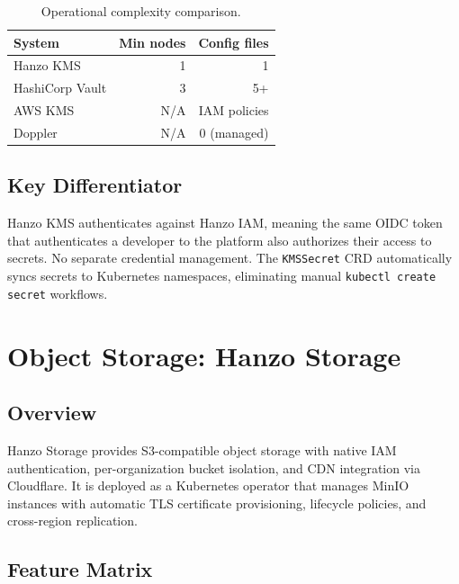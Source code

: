 \documentclass[11pt,twocolumn]{article}
\begin{document}
\begin{table}[H]
\centering
\caption{Operational complexity comparison.}
\footnotesize
\begin{tabular}{@{}lrr@{}}
\toprule
System & Min nodes & Config files \\
\midrule
Hanzo KMS & 1 & 1 \\
HashiCorp Vault & 3 & 5+ \\
AWS KMS & N/A & IAM policies \\
Doppler & N/A & 0 (managed) \\
\bottomrule
\end{tabular}
\end{table}

\subsection{Key Differentiator}

Hanzo KMS authenticates against Hanzo IAM, meaning the same OIDC token that authenticates a developer to the platform also authorizes their access to secrets. No separate credential management. The \texttt{KMSSecret} CRD automatically syncs secrets to Kubernetes namespaces, eliminating manual \texttt{kubectl create secret} workflows.

\section{Object Storage: Hanzo Storage}
\label{sec:storage}

\subsection{Overview}

Hanzo Storage provides S3-compatible object storage with native IAM authentication, per-organization bucket isolation, and CDN integration via Cloudflare. It is deployed as a Kubernetes operator that manages MinIO instances with automatic TLS certificate provisioning, lifecycle policies, and cross-region replication.

\subsection{Feature Matrix}
\end{document}
